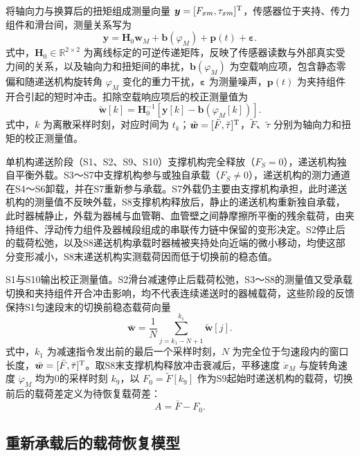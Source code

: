 \documentclass{JQR_LaTeX_Template-0507/JQRnew}
\begin{document}
将轴向力与换算后的扭矩组成测量向量 $\bm y=[F_{xm},\tau_{xm}]^{\rm T}$，传感器位于夹持、传力组件和滑台间，测量关系写为
\begin{equation}
\label{eq:measurement}
\bm y=\bm H_0\bm w_M+\bm b(\varphi_M)+\bm p(t)+\bm\varepsilon.
\end{equation}
式中，$\bm H_0\in\mathbb R^{2\times2}$ 为离线标定的可逆传递矩阵，反映了传感器读数与外部真实受力间的关系，以及轴向力和扭矩间的串扰，$\bm b(\varphi_M)$ 为空载响应项，包含静态零偏和随递送机构旋转角 $\varphi_M$ 变化的重力干扰，$\bm\varepsilon$ 为测量噪声，$\bm p(t)$ 为夹持组件开合引起的短时冲击。扣除空载响应项后的校正测量值为
\begin{equation}
\label{eq:corrected-measurement}
\tilde{\bm w}[k]=\bm H_0^{-1}\!\left[
\bm y[k]-\bm b(\varphi_M[k])\right].
\end{equation}
式中，$k$ 为离散采样时刻，对应时间为 $t_k$；$\tilde{\bm w}=[\tilde F,\tilde\tau]^{\rm T}$，$\tilde F$、$\tilde\tau$ 分别为轴向力和扭矩的校正测量值。

单机构递送阶段（S1、S2、S9、S10）支撑机构完全释放（$F_S=0$），递送机构独自平衡外载。S3～S7中支撑机构参与或独自承载（$F_S\neq0$），递送机构的测力通道在S4～S6卸载，并在S7重新参与承载。S7外载仍主要由支撑机构承担，此时递送机构的测量值不反映外载，S8支撑机构释放后，静止的递送机构重新独自承载，此时器械静止，外载为器械与血管鞘、血管壁之间静摩擦所平衡的残余载荷，由夹持组件、浮动传力组件及器械段组成的串联传力链中保留的变形决定。S2停止后的载荷松弛，以及S8递送机构承载时器械被夹持处向近端的微小移动，均使这部分变形减小，S8末递送机构实测载荷因而低于切换前的稳态值。

S1与S10输出校正测量值。S2滑台减速停止后载荷松弛，S3～S8的测量值又受承载切换和夹持组件开合冲击影响，均不代表连续递送时的器械载荷，这些阶段的反馈保持S1匀速段末的切换前稳态载荷向量
\begin{equation}
	\label{eq:lock}
	\bar{\bm w}=\frac{1}{N}
\sum_{j=k_1-N+1}^{k_1}
\tilde{\bm w}[j].
\end{equation}
式中，$k_1$ 为减速指令发出前的最后一个采样时刻，$N$ 为完全位于匀速段内的窗口长度，$\bar{\bm w}=[\bar F,\bar\tau]^{\rm T}$。取S8末支撑机构释放冲击衰减后，平移速度 $\dot x_M$ 与旋转角速度 $\dot\varphi_M$ 均为0的采样时刻 $k_9$，以 $F_0=\tilde F[k_9]$ 作为S9起始时递送机构的载荷，切换前后的载荷差定义为待恢复载荷差：
\begin{equation}
	\label{eq:deficit}
	A=\bar F-F_0.
\end{equation}


\subsection{重新承载后的载荷恢复模型}
\end{document}
